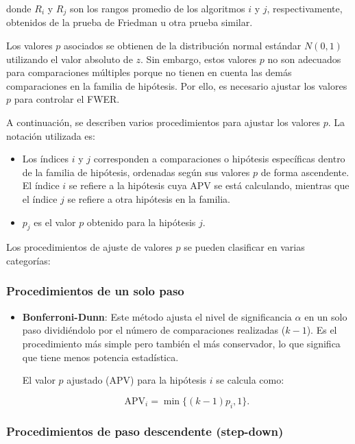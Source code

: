 donde $R_i$ y $R_j$ son los rangos promedio de los algoritmos $i$ y $j$, respectivamente, obtenidos de la prueba de Friedman u otra prueba similar.

Los valores $p$ asociados se obtienen de la distribución normal estándar $N(0,1)$ utilizando el valor absoluto de $z$. Sin embargo, estos valores $p$ no son adecuados para comparaciones múltiples porque no tienen en cuenta las demás comparaciones en la familia de hipótesis. Por ello, es necesario ajustar los valores $p$ para controlar el FWER.

A continuación, se describen varios procedimientos para ajustar los valores $p$. La notación utilizada es:

\begin{itemize}
    \item Los índices $i$ y $j$ corresponden a comparaciones o hipótesis específicas dentro de la familia de hipótesis, ordenadas según sus valores $p$ de forma ascendente. El índice $i$ se refiere a la hipótesis cuya APV se está calculando, mientras que el índice $j$ se refiere a otra hipótesis en la familia.
    \item $p_j$ es el valor $p$ obtenido para la hipótesis $j$.
\end{itemize}

Los procedimientos de ajuste de valores $p$ se pueden clasificar en varias categorías:

\subsubsection{Procedimientos de un solo paso}

\begin{itemize}
    \item \textbf{Bonferroni-Dunn}: Este método ajusta el nivel de significancia $\alpha$ en un solo paso dividiéndolo por el número de comparaciones realizadas ($k - 1$). Es el procedimiento más simple pero también el más conservador, lo que significa que tiene menos potencia estadística.

    El valor $p$ ajustado (APV) para la hipótesis $i$ se calcula como:

    \[
    \text{APV}_i = \min\{(k - 1) p_i, 1\}.
    \]
\end{itemize}

\subsubsection{Procedimientos de paso descendente (step-down)}

